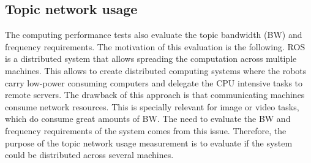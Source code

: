 


\newpage
		\subsection{Topic network usage}

		The computing performance tests also evaluate the topic bandwidth (BW) and frequency requirements. 
		The motivation of this evaluation is the following.
		ROS is a distributed system that allows spreading the computation across multiple machines. 
		This allows to create distributed computing systems where the robots carry low-power consuming computers and delegate the CPU intensive tasks to remote servers.	
		The drawback of this approach is that communicating machines consume network resources. 
		This is specially relevant for image or video tasks, which do consume great amounts of BW. 
		The need to evaluate the BW and frequency requirements of the system comes from this issue. 
		Therefore, the purpose of the topic network usage measurement is to evaluate if the system could be distributed across several machines.
		\\

